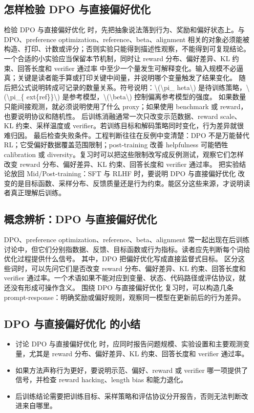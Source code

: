 \documentclass[a4paper]{article}
\begin{document}
\subsection{怎样检验 DPO 与直接偏好优化}
检验 DPO 与直接偏好优化 时，先把抽象说法落到行为、奖励和偏好状态上。与 DPO、preference optimization、reference、beta、alignment 相关的对象必须能被构造、打印、计数或评分；否则实验只能得到描述性观察，不能得到可复现结论。
一个合适的小实验应当保留本节机制，同时让 reward 分布、偏好差异、KL 约束、回答长度和 verifier 通过率 中至少一个量发生可解释变化。输入规模不必逼真；关键是读者能手算或打印关键中间量，并说明哪个变量触发了结果变化。
随后把公式说明转成可记录的数量关系。符号说明：\textbackslash{}(\textbackslash{}pi\_ heta\textbackslash{}) 是待训练策略，\textbackslash{}(\textbackslash{}pi\_\{ ext\{ref\}\}\textbackslash{}) 是参考模型，\textbackslash{}(\textbackslash{}beta\textbackslash{}) 控制偏离参考模型的强度。 如果数量只能间接观测，就必须说明使用了什么 proxy；如果使用 benchmark 或 reward，也要说明协议和随机性。
后训练消融通常一次只改变示范数据、reward scale、KL 约束、采样温度或 verifier。若训练目标和解码策略同时变化，行为差异就很难归因。
最后检查失败条件。工程判断往往在反例中变清楚：DPO 不是万能替代 RL；它受偏好数据覆盖范围限制；post-training 改善 helpfulness 可能牺牲 calibration 或 diversity。复习时可以把这些限制改写成反例测试，观察它们怎样改变 reward 分布、偏好差异、KL 约束、回答长度和 verifier 通过率。
把实验结论放回 Mid/Post-training：SFT 与 RLHF 时，要说明 DPO 与直接偏好优化 改变的是目标函数、采样分布、反馈质量还是行为约束。能区分这些来源，才说明读者真正理解后训练。
\subsection{概念辨析：DPO 与直接偏好优化}
DPO、preference optimization、reference、beta、alignment 常一起出现在后训练讨论中，但它们分别指数据、反馈、目标函数或行为指标。读者应先判断每个词给优化过程提供什么信号。
其中，DPO 把偏好优化写成直接监督式目标。
区分这些词时，可以先问它们是否改变 reward 分布、偏好差异、KL 约束、回答长度和 verifier 通过率。一个术语如果不能对应到变量、状态、代码路径或评估协议，就还没有形成可操作含义。
围绕 DPO 与直接偏好优化 复习时，可以构造几条 prompt-response：明确奖励或偏好规则，观察同一模型在更新前后的行为差异。
\subsection{DPO 与直接偏好优化 的小结}
\begin{itemize}
\item 讨论 DPO 与直接偏好优化 时，应同时报告问题规模、实验设置和主要观测变量，尤其是 reward 分布、偏好差异、KL 约束、回答长度和 verifier 通过率。
\item 如果方法声称行为更好，要说明示范、偏好、reward 或 verifier 哪一项提供了信号，并检查 reward hacking、length bias 和能力退化。
\item 后训练结论需要把训练目标、采样策略和评估协议分开报告，否则无法判断改进来自哪里。
\end{itemize}
\end{document}
